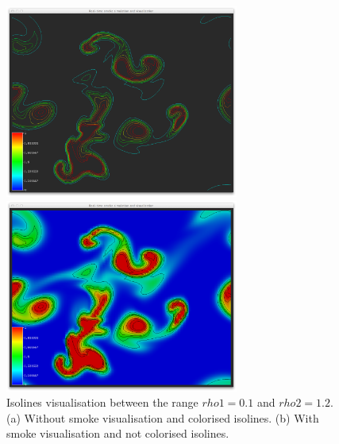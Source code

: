 \begin{figure}[htbp]
\begin{center}
\begin{minipage}[t]{0.48\textwidth}
\includegraphics[height=2.5in]{figures/isolines/isolines.png}
\end{minipage}
\begin{minipage}[t]{0.48\textwidth}
\includegraphics[height=2.5in]{figures/isolines/isolinesSmoke.png}
\end{minipage}
\caption{Isolines visualisation between the range $rho1 = 0.1$ and $rho2 = 1.2$. (a) Without smoke visualisation and colorised isolines. (b) With smoke visualisation and not colorised isolines.}
\label{fig:isolines}
\end{center}
\end{figure}
